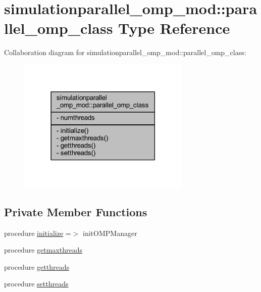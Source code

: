 \hypertarget{structsimulationparallel__omp__mod_1_1parallel__omp__class}{}\section{simulationparallel\+\_\+omp\+\_\+mod\+:\+:parallel\+\_\+omp\+\_\+class Type Reference}
\label{structsimulationparallel__omp__mod_1_1parallel__omp__class}


Collaboration diagram for simulationparallel\+\_\+omp\+\_\+mod\+:\+:parallel\+\_\+omp\+\_\+class\+:\nopagebreak
\begin{figure}[H]
\begin{center}
\leavevmode
\includegraphics[width=234pt]{structsimulationparallel__omp__mod_1_1parallel__omp__class__coll__graph}
\end{center}
\end{figure}
\subsection*{Private Member Functions}
\begin{DoxyCompactItemize}
\item 
procedure \mbox{\hyperlink{structsimulationparallel__omp__mod_1_1parallel__omp__class_ac76717b6ab207e19f5ebecd8309a6aee}{initialize}} =$>$ init\+O\+M\+P\+Manager
\item 
procedure \mbox{\hyperlink{structsimulationparallel__omp__mod_1_1parallel__omp__class_aea4b7dd8b8106cf1a92323dfc5a28d3d}{getmaxthreads}}
\item 
procedure \mbox{\hyperlink{structsimulationparallel__omp__mod_1_1parallel__omp__class_ac2d38cd70cbea7327c9af2ea99484454}{getthreads}}
\item 
procedure \mbox{\hyperlink{structsimulationparallel__omp__mod_1_1parallel__omp__class_ac8ddadaad72a2b55251d910cd156e23e}{setthreads}}
\end{DoxyCompactItemize}
